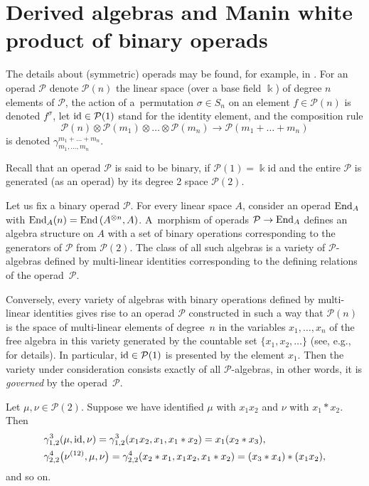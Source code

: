 \documentclass[11pt]{article}
\numberwithin{equation}{section}
\numberwithin{equation}{section}
\def\id {\mathop {\fam 0 id}\nolimits}
\def\End {\mathop {\fam 0 End}\nolimits}
\begin{document}
\section{Derived algebras and Manin white product of binary operads}

The details about (symmetric) operads may be found, for example,
in \cite{Bremner-Dotsenko}.
For an operad $\mathcal P$ denote
$\mathcal P(n)$ the linear space (over a base field $\Bbbk $)
of degree $n$ elements of $\mathcal P$, the action of a~permutation $\sigma \in S_n$
on an element $f\in \mathcal P(n)$ is denoted $f^\sigma $,
let $\id \in \mathcal P(1) $ stand for the identity element,
and the composition rule
\[
\mathcal P(n)\otimes \mathcal P(m_1)\otimes \dots \otimes \mathcal P(m_n) \to \mathcal P(m_1+\dots + m_n)
\]
is denoted $\gamma^{m_1+\dots+m_n}_{m_1,\dots , m_n}$.

Recall that an operad $\mathcal P$ is said to be binary, if
$\mathcal P(1)=\Bbbk \mathrm{id}$ and the entire
$\mathcal P$ is generated (as an operad) by its degree 2 space
$\mathcal P(2)$.

Let us fix a binary operad $\mathcal P$.
For every
linear space $A$, consider an operad
$\End_A$
with $\End_A(n)=\mathrm{End}\,(A^{\otimes n}, A)$.
A~morphism of operads
$\mathcal P \to \End_A$ defines an algebra structure
on $A$ with a set of binary operations corresponding
to the generators of $\mathcal P$ from $\mathcal P(2)$.
The class of all such algebras is a variety
 of $\mathcal P$-algebras
defined by multi-linear identities corresponding
to the defining relations of the operad~$\mathcal P$.

Conversely, every variety of algebras with binary operations
defined by multi-linear identities gives rise to
an operad $\mathcal P$ constructed in such a way that
$\mathcal P(n)$ is the space of multi-linear elements
of degree~$n$ in the variables $x_1,\ldots, x_n$
of the free algebra in this variety generated by the countable set
$\{x_1,x_2,\ldots \}$
(see, e.g., \cite[Section~1.3.5]{Kol2008_smz} for details).
In particular, $\id\in \mathcal P(1)$
is presented by the element $x_1$.
Then the variety under consideration consists
exactly of all $\mathcal P$-algebras, in other words, it is
{\em governed} by the operad~$\mathcal P$.

\begin{Example}
Let $\mu,\nu \in \mathcal P(2)$. Suppose we have identified
$\mu $ with $x_1x_2$ and $\nu $ with $x_1*x_2$.
Then{\samepage
\begin{gather*}
\begin{split}
&\gamma^3_{1,2}(\mu, \id, \nu )
= \gamma^3_{1,2} (x_1x_2, x_1, x_1*x_2)
= x_1(x_2*x_3),
\\
&\gamma^4_{2,2}\bigl(\nu^{(12)}, \mu, \nu \bigr)
= \gamma^4_{2,2}(x_2*x_1, x_1x_2, x_1*x_2)
= (x_3*x_4)*(x_1x_2),
\end{split}
\end{gather*}
and so on.}
\end{Example}
\end{document}
